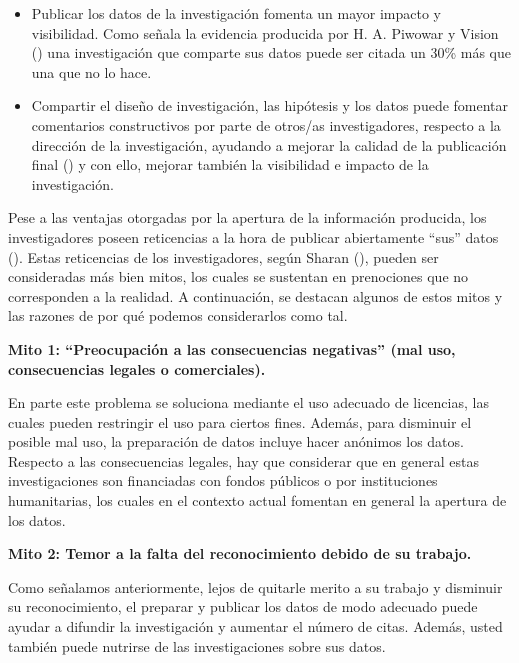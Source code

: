 \documentclass[
  spanish,
  a4paper,
  oneside]{scrbook}
\begin{document}
\begin{itemize}
  \begin{itemize}
  \item
    Publicar los datos de la investigación fomenta un mayor impacto y
    visibilidad. Como señala la evidencia producida por H. A. Piwowar y
    Vision () una investigación
    que comparte sus datos puede ser citada un 30\% más que una que no
    lo hace.
  \item
    Compartir el diseño de investigación, las hipótesis y los datos
    puede fomentar comentarios constructivos por parte de otros/as
    investigadores, respecto a la dirección de la investigación,
    ayudando a mejorar la calidad de la publicación final
    () y con ello, mejorar
    también la visibilidad e impacto de la investigación.
  \end{itemize}
\end{itemize}

Pese a las ventajas otorgadas por la apertura de la información
producida, los investigadores poseen reticencias a la hora de publicar
abiertamente ``sus'' datos (). Estas reticencias de los investigadores, según Sharan
(), pueden ser consideradas más bien
mitos, los cuales se sustentan en prenociones que no corresponden a la
realidad. A continuación, se destacan algunos de estos mitos y las
razones de por qué podemos considerarlos como tal.

\textbf{Mito 1: ``Preocupación a las consecuencias negativas'' (mal uso,
consecuencias legales o comerciales).}

En parte este problema se soluciona mediante el uso adecuado de
licencias, las cuales pueden restringir el uso para ciertos fines.
Además, para disminuir el posible mal uso, la preparación de datos
incluye hacer anónimos los datos. Respecto a las consecuencias legales,
hay que considerar que en general estas investigaciones son financiadas
con fondos públicos o por instituciones humanitarias, los cuales en el
contexto actual fomentan en general la apertura de los datos.

\textbf{Mito 2: Temor a la falta del reconocimiento debido de su
trabajo.}

Como señalamos anteriormente, lejos de quitarle merito a su trabajo y
disminuir su reconocimiento, el preparar y publicar los datos de modo
adecuado puede ayudar a difundir la investigación y aumentar el número
de citas. Además, usted también puede nutrirse de las investigaciones
sobre sus datos.
\end{document}
